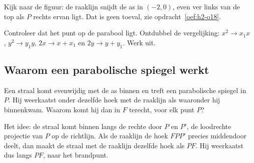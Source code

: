
Kijk naar de figuur: de raaklijn snijdt de as in $(-2, 0)$, even ver links van de top als $P$ rechts ervan ligt. Dat is geen toeval, zie opdracht~\ref{oef:h2-o18}.

\begin{werkwijze}
Controleer dat het punt op de parabool ligt. Ontdubbel de vergelijking: $x^2 \to x_1 x$, $y^2 \to y_1 y$, $2x \to x + x_1$ en $2y \to y + y_1$. Werk uit.
\end{werkwijze}


\begin{oefeningen}
\end{oefeningen}

\subsection{Waarom een parabolische spiegel werkt}

Een straal komt evenwijdig met de as binnen en treft een parabolische spiegel in $P$. Hij weerkaatst onder dezelfde hoek met de raaklijn als waaronder hij binnenkwam. Waarom komt hij dan in $F$ terecht, voor elk punt $P$?

Het idee: de straal komt binnen langs de rechte door $P$ en $P'$, de loodrechte projectie van $P$ op de richtlijn. Als de raaklijn de hoek $FPP'$ precies middendoor deelt, dan maakt de straal met de raaklijn dezelfde hoek als $PF$. Hij weerkaatst dus langs $PF$, naar het brandpunt.

